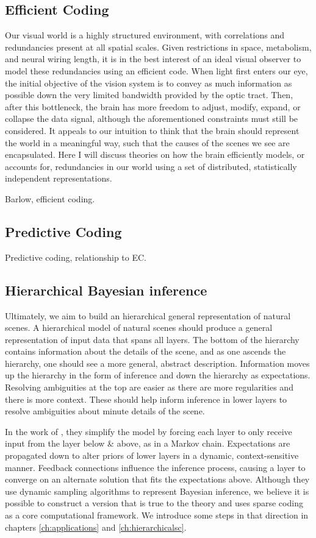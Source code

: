 \subsection{Efficient Coding}
Our visual world is a highly structured environment, with correlations and redundancies present at all spatial scales. Given restrictions in space, metabolism, and neural wiring length, it is in the best interest of an ideal visual observer to model these redundancies using an efficient code. When light first enters our eye, the initial objective of the vision system is to convey as much information as possible down the very limited bandwidth provided by the optic tract. Then, after this bottleneck, the brain has more freedom to adjust, modify, expand, or collapse the data signal, although the aforementioned constraints must still be considered. It appeals to our intuition to think that the brain should represent the world in a meaningful way, such that the causes of the scenes we see are encapsulated. Here I will discuss theories on how the brain efficiently models, or accounts for, redundancies in our world using a set of distributed, statistically independent representations.

Barlow, efficient coding.

\subsection{Predictive Coding}
Predictive coding, relationship to EC.

\subsection{Hierarchical Bayesian inference}
Ultimately, we aim to build an hierarchical general representation of natural scenes. A hierarchical model of natural scenes should produce a general representation of input data that spans all layers. The bottom of the hierarchy contains information about the details of the scene, and as one ascends the hierarchy, one should see a more general, abstract description. Information moves up the hierarchy in the form of inference and down the hierarchy as expectations. Resolving ambiguities at the top are easier as there are more regularities and there is more context. These should help inform inference in lower layers to resolve ambiguities about minute details of the scene.

In the work of \citet{lee2003hierarchical}, they simplify the model by forcing each layer to only receive input from the layer below & above, as in a Markov chain. Expectations are propagated down to alter priors of lower layers in a dynamic, context-sensitive manner. Feedback connections influence the inference process, causing a layer to converge on an alternate solution that fits the expectations above. Although they use dynamic sampling algorithms to represent Bayesian inference, we believe it is possible to construct a version that is true to the theory and uses sparse coding as a core computational framework. We introduce some steps in that direction in chapters \ref{ch:applications} and \ref{ch:hierarchicalsc}.

